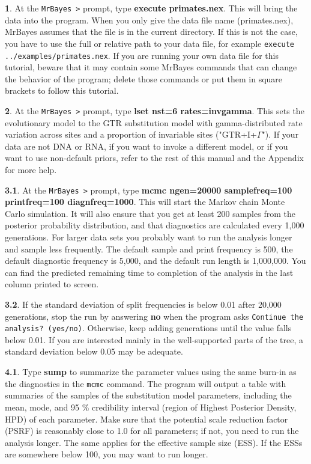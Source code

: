 \documentclass[12pt]{book}
\begin{document}
\textbf{1}. At the \texttt{MrBayes >} prompt, type \textbf{execute primates.nex}. This will bring the data
 into the program. When you only give the data file name (primates.nex), MrBayes assumes that the file is in
 the current directory. If this is not the case, you have to use the full or relative path to your data file,
 for example \texttt{execute ../examples/primates.nex}. If you are running your own data file for this tutorial,
 beware that it may contain some MrBayes commands that can change the behavior of the program; delete those
 commands or put them in square brackets to follow this tutorial. 

\textbf{2}. At the \texttt{MrBayes >} prompt, type \textbf{lset nst=6 rates=invgamma}. This sets the 
evolutionary model to the GTR substitution model with gamma-distributed rate variation across sites and a
 proportion of invariable sites ("GTR+I+$\Gamma$"). If your data are not DNA or RNA, if you want to invoke a different model,
 or if you want to use non-default priors, refer to the rest of this manual and the Appendix for more help.

\textbf{3.1}. At the \texttt{MrBayes >} prompt, type \textbf{mcmc ngen=20000 samplefreq=100 printfreq=100
 diagnfreq=1000}. This will start the Markov chain Monte Carlo simulation. It will also ensure that you 
 get at least 200 samples from the posterior probability distribution, and that diagnostics are
 calculated every 1,000 generations. For larger data sets you probably want to run the analysis longer 
 and sample less frequently. The default sample and print frequency is 500, the default diagnostic 
 frequency is 5,000, and the default run length is 1,000,000. You can find the predicted remaining 
 time to completion of the analysis in the last column printed to screen.

\textbf{3.2}. If the standard deviation of split frequencies is below 0.01 after 20,000 generations,
 stop the run by answering \textbf{no} when the program asks \texttt{Continue the analysis? (yes/no)}.
 Otherwise, keep adding generations until the value falls below 0.01. If you are interested mainly in
 the well-supported parts of the tree, a standard deviation below 0.05 may be adequate.

\textbf{4.1}. Type \textbf{sump} to summarize the parameter values using the same burn-in as the
 diagnostics in the \texttt{mcmc} command. The program will output a table with summaries of the samples
 of the substitution model parameters, including the mean, mode, and 95 \% credibility interval
 (region of Highest Posterior Density, HPD) of each parameter. Make sure that the potential scale reduction
 factor (PSRF) is reasonably close to 1.0 for all parameters; if not, you need to run the analysis longer.
 The same applies for the effective sample size (ESS). If the ESSs are somewhere below 100, you may want
 to run longer.
\end{document}
